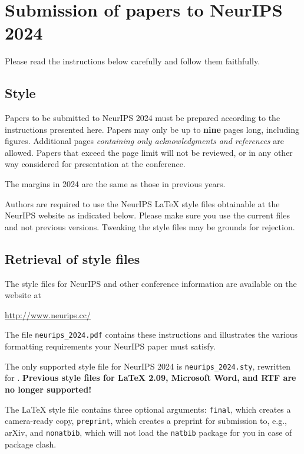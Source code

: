 \documentclass{article}
\begin{document}
\section{Submission of papers to NeurIPS 2024}


Please read the instructions below carefully and follow them faithfully.


\subsection{Style}


Papers to be submitted to NeurIPS 2024 must be prepared according to the
instructions presented here. Papers may only be up to {\bf nine} pages long,
including figures. Additional pages \emph{containing only acknowledgments and
references} are allowed. Papers that exceed the page limit will not be
reviewed, or in any other way considered for presentation at the conference.


The margins in 2024 are the same as those in previous years.


Authors are required to use the NeurIPS \LaTeX{} style files obtainable at the
NeurIPS website as indicated below. Please make sure you use the current files
and not previous versions. Tweaking the style files may be grounds for
rejection.


\subsection{Retrieval of style files}


The style files for NeurIPS and other conference information are available on
the website at
\begin{center}
  \url{http://www.neurips.cc/}
\end{center}
The file \verb+neurips_2024.pdf+ contains these instructions and illustrates the
various formatting requirements your NeurIPS paper must satisfy.


The only supported style file for NeurIPS 2024 is \verb+neurips_2024.sty+,
rewritten for \LaTeXe{}.  \textbf{Previous style files for \LaTeX{} 2.09,
  Microsoft Word, and RTF are no longer supported!}


The \LaTeX{} style file contains three optional arguments: \verb+final+, which
creates a camera-ready copy, \verb+preprint+, which creates a preprint for
submission to, e.g., arXiv, and \verb+nonatbib+, which will not load the
\verb+natbib+ package for you in case of package clash.
\end{document}

